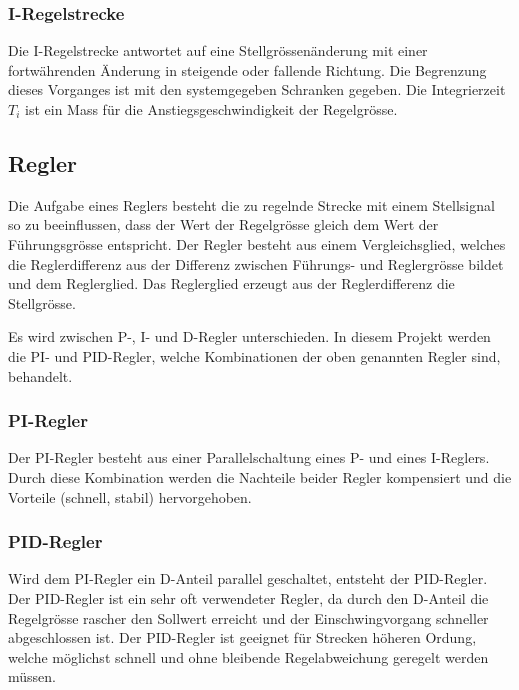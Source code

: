 
\subsubsection*{I-Regelstrecke}
Die  I-Regelstrecke  antwortet  auf eine  Stellgr\"ossen\"anderung  mit  einer
fortw\"ahrenden   \"Anderung   in   steigende  oder   fallende   Richtung. Die
Begrenzung dieses  Vorganges ist mit den  systemgegeben Schranken gegeben. Die
Integrierzeit  $T_i$  ist  ein  Mass  f\"ur  die  Anstiegsgeschwindigkeit  der
Regelgr\"osse.


\subsection{Regler}
Die  Aufgabe  eines  Reglers  besteht   die  zu  regelnde  Strecke  mit  einem
Stellsignal  so  zu  beeinflussen,  dass der  Wert  der  Regelgr\"osse  gleich
dem  Wert  der F\"uhrungsgr\"osse  entspricht. Der  Regler  besteht aus  einem
Vergleichsglied,  welches  die  Reglerdifferenz  aus  der  Differenz  zwischen
F\"uhrungs-  und Reglergr\"osse  bildet und  dem Reglerglied. Das  Reglerglied
erzeugt aus der Reglerdifferenz die Stellgr\"osse.

Es wird zwischen P-, I- und  D-Regler unterschieden.  In diesem Projekt werden
die PI- und  PID-Regler, welche Kombinationen der oben  genannten Regler sind,
behandelt.

\subsubsection*{PI-Regler}
Der  PI-Regler  besteht  aus  einer   Parallelschaltung  eines  P-  und  eines
I-Reglers. Durch  diese   Kombination  werden  die  Nachteile   beider  Regler
kompensiert und die Vorteile (schnell, stabil) hervorgehoben.

\subsubsection*{PID-Regler}
Wird   dem  PI-Regler   ein   D-Anteil  parallel   geschaltet,  entsteht   der
PID-Regler. Der  PID-Regler ist  ein  sehr oft  verwendeter  Regler, da  durch
den  D-Anteil  die  Regelgr\"osse  rascher   den  Sollwert  erreicht  und  der
Einschwingvorgang  schneller abgeschlossen  ist. Der  PID-Regler ist  geeignet
f\"ur Strecken h\"oheren Ordung, welche m\"oglichst schnell und ohne bleibende
Regelabweichung geregelt werden m\"ussen.


